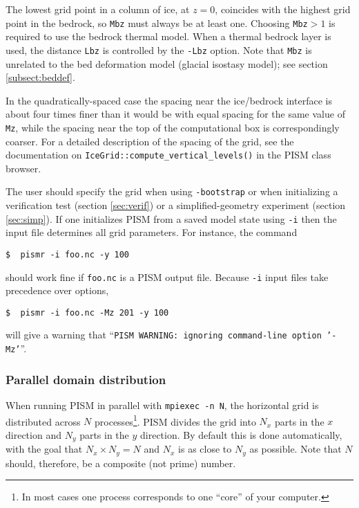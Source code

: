 The lowest grid point in a column of ice, at $z=0$, coincides with the highest grid point in the bedrock, so \texttt{Mbz} must always be at least one.  Choosing \texttt{Mbz}$>1$ is required to use the bedrock thermal model.  When a thermal bedrock layer is used, the distance \texttt{Lbz} is controlled by the \texttt{-Lbz} option.  Note that \texttt{Mbz} is unrelated to the bed deformation model (glacial isostasy model); see section \ref{subsect:beddef}.

In the quadratically-spaced case the spacing near the ice/bedrock interface is about four times finer than it would be with equal spacing for the same value of \texttt{Mz}, while the spacing near the top of the computational box is correspondingly coarser.  For a detailed description of the spacing of the grid, see the documentation on \texttt{IceGrid::compute_vertical_levels()} in the PISM class browser.

The user should specify the grid when using \texttt{-bootstrap} or when initializing a verification test (section \ref{sec:verif}) or a simplified-geometry experiment (section \ref{sec:simp}).  If one initializes PISM from a saved model state using \texttt{-i} then the input file determines all grid parameters.  For instance, the command

\begin{verbatim}
$  pismr -i foo.nc -y 100
\end{verbatim}

\noindent should work fine if \texttt{foo.nc} is a PISM output file.  Because \texttt{-i} input files take precedence over options,

\begin{verbatim}
$  pismr -i foo.nc -Mz 201 -y 100
\end{verbatim}

\noindent will give a warning that ``\texttt{PISM WARNING: ignoring command-line option '-Mz'}''.


\subsubsection{Parallel domain distribution}
\label{sec:domain-dstribution}

When running PISM in parallel with \texttt{mpiexec -n N}, the horizontal grid is distributed across $N$ processes\footnote{In most cases one process corresponds to one ``core'' of your computer.}.  PISM divides the grid into $N_x$ parts in the $x$ direction and $N_y$ parts in the $y$ direction.  By default this is done automatically, with the goal that $N_x\times N_y = N$ and $N_x$ is as close to $N_y$ as possible.  Note that $N$ should, therefore, be a composite (not prime) number.

